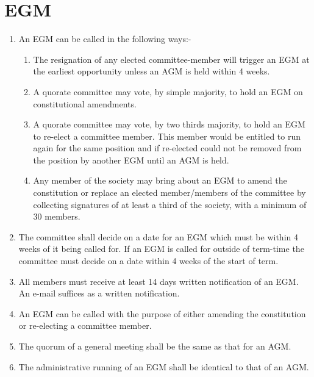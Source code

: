 \documentclass[a4paper]{article}
\begin{document}
\newpage{}
\section{EGM}

\begin{enumerate}

  \item An EGM can be called in the following ways:-
    \begin {enumerate}
      \item The resignation of any elected committee-member will trigger an
        EGM at the earliest opportunity unless an AGM is held within 4
        weeks.
      \item A quorate committee may vote, by simple majority, to hold an EGM
        on constitutional amendments.
      \item A quorate committee may vote, by two thirds majority, to hold an
        EGM to re-elect a committee member. This member would be entitled
        to run again for the same position and if re-elected could not be
        removed from the position by another EGM until an AGM is held.
      \item Any member of the society may bring about an EGM to amend the
        constitution or replace an elected member/members of the committee
        by collecting signatures of at least a third of the society, with a
        minimum of 30 members.
    \end{enumerate}

  \item The committee shall decide on a date for an EGM which must be within
    4 weeks of it being called for. If an EGM is called for outside of term-time
    the committee must decide on a date within 4 weeks of the start of term.

  \item All members must receive at least 14 days written notification of an EGM.
    An e-mail suffices as a written notification.

  \item An EGM can be called with the purpose of either amending the constitution
    or re-electing a committee member.
  
  \item The quorum of a general meeting shall be the same as that for an AGM.

  \item The administrative running of an EGM shall be identical to that of an AGM.

\end{enumerate}
\end{document}

